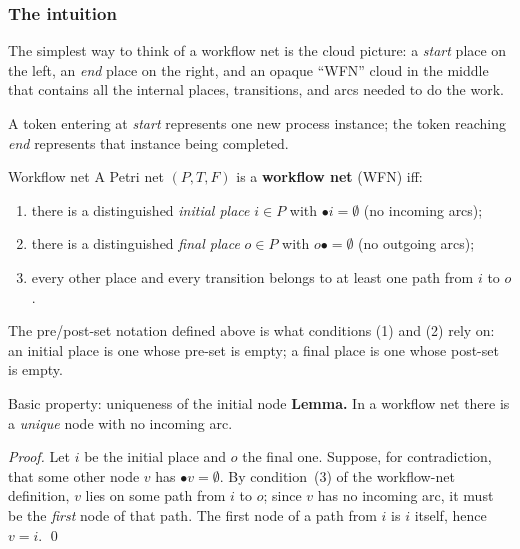 \subsubsection{The intuition}

The simplest way to think of a workflow net is the cloud picture: a \emph{start} place on the left, an \emph{end} place on the right, and an opaque ``WFN'' cloud in the middle that contains all the internal places, transitions, and arcs needed to do the work.

\medskip
\begin{center}
\end{center}

A token entering at \emph{start} represents one new process instance; the token reaching \emph{end} represents that instance being completed.

\begin{definitionbox}{Workflow net}
A Petri net $(P, T, F)$ is a \textbf{workflow net} (WFN) iff:
\begin{enumerate}
  \item there is a distinguished \emph{initial place} $i \in P$ with $\bullet i = \emptyset$ (no incoming arcs);
  \item there is a distinguished \emph{final place} $o \in P$ with $o \bullet = \emptyset$ (no outgoing arcs);
  \item every other place and every transition belongs to at least one path from $i$ to $o$.
\end{enumerate}
\end{definitionbox}

The pre/post-set notation defined above is what conditions (1) and (2) rely on: an initial place is one whose pre-set is empty; a final place is one whose post-set is empty.

\begin{notebox}{Basic property: uniqueness of the initial node}
\textbf{Lemma.} In a workflow net there is a \emph{unique} node with no incoming arc.

\medskip

\textit{Proof.} Let $i$ be the initial place and $o$ the final one. Suppose, for contradiction, that some other node $v$ has $\bullet v = \emptyset$. By condition~(3) of the workflow-net definition, $v$ lies on some path from $i$ to $o$; since $v$ has no incoming arc, it must be the \emph{first} node of that path. The first node of a path from $i$ is $i$ itself, hence $v = i$. \qed
\end{notebox}


